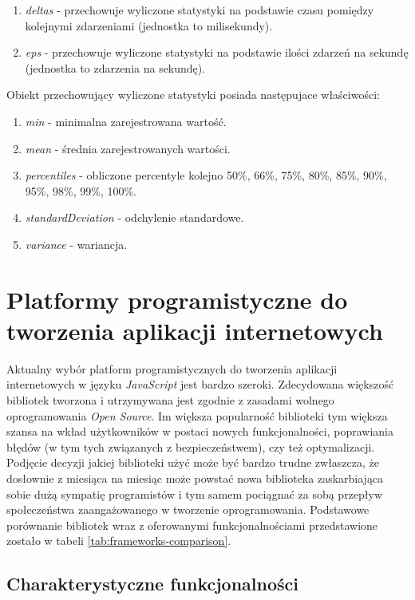 \documentclass[polish, twoside, 12pt]{mwart}
\let\stdsection\section
\renewcommand*{\section}{\clearpage\stdsection}
\begin{document}
\begin{enumerate}
  \item \emph{deltas} - przechowuje wyliczone statystyki na podstawie czasu pomiędzy kolejnymi zdarzeniami (jednostka to milisekundy).
  \item \emph{eps} - przechowuje wyliczone statystyki na podstawie ilości zdarzeń na sekundę (jednostka to zdarzenia na sekundę).
\end{enumerate}

Obiekt przechowujący wyliczone statystyki posiada następujace właściwości:

\begin{enumerate}
  \item \emph{min} - minimalna zarejestrowana wartość.
  \item \emph{mean} - średnia zarejestrowanych wartości.
  \item \emph{percentiles} - obliczone percentyle kolejno 50\%, 66\%, 75\%, 80\%, 85\%, 90\%, 95\%, 98\%, 99\%, 100\%.
  \item \emph{standardDeviation} - odchylenie standardowe.
  \item \emph{variance} - wariancja.
\end{enumerate}

\section{Platformy programistyczne do tworzenia aplikacji internetowych}

Aktualny wybór platform programistycznych do tworzenia aplikacji internetowych w języku \emph{JavaScript} jest bardzo szeroki. Zdecydowana większość bibliotek tworzona i utrzymywana jest zgodnie z zasadami wolnego oprogramowania \emph{Open Source}. Im większa popularność biblioteki tym większa szansa na wkład użytkowników w postaci nowych funkcjonalności, poprawiania błędów (w tym tych związanych z bezpieczeństwem), czy też optymalizacji. Podjęcie decyzji jakiej biblioteki użyć może być bardzo trudne zwłaszcza, że dosłownie z miesiąca na miesiąc może powstać nowa biblioteka zaskarbiająca sobie dużą sympatię programistów i tym samem pociągnać za sobą przepływ społeczeństwa zaangażowanego w tworzenie oprogramowania. Podstawowe porównanie bibliotek wraz z oferowanymi funkcjonalnościami przedstawione zostało w tabeli \ref{tab:frameworks-comparison}.

\subsection{Charakterystyczne funkcjonalności}
\end{document}
